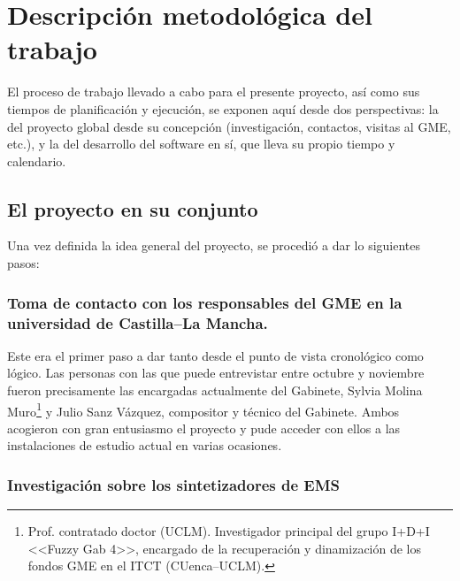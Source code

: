 \chapter[Descripción metodológica\dots]{Descripción metodológica del trabajo }

El proceso de trabajo llevado a cabo para el presente proyecto, así como sus tiempos de planificación y ejecución, se exponen aquí desde dos perspectivas: la del proyecto global desde su concepción (investigación, contactos, visitas al GME, etc.), y la del desarrollo del software en sí, que lleva su propio tiempo y calendario. 

\section[El proyecto en su conjunto]{El proyecto en su conjunto }

Una vez definida la idea general del proyecto, se procedió a dar lo siguientes pasos:

\subsection{Toma de contacto con los responsables del GME en la universidad de Castilla--La Mancha. }

Este era el primer paso a dar tanto desde el punto de vista cronológico como lógico. Las personas con las que puede entrevistar entre octubre y noviembre fueron precisamente las encargadas actualmente del Gabinete, Sylvia Molina Muro\footnote{Prof. contratado doctor (UCLM). Investigador principal del grupo I+D+I <<Fuzzy Gab 4>>, encargado de la recuperación y dinamización de los fondos GME en el ITCT (CUenca--UCLM).} y Julio Sanz Vázquez, compositor y técnico del Gabinete. Ambos acogieron con gran entusiasmo el proyecto y pude acceder con ellos a las instalaciones de estudio actual en varias ocasiones.

\subsection{Investigación sobre los sintetizadores de EMS}

